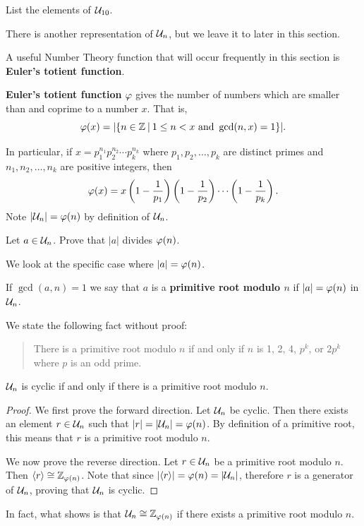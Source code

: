 \begin{exercise}
    List the elements of $\mathcal{U}_{10}$.
\end{exercise}

There is another representation of $\mathcal{U}_{n}$, but we leave it to later in this section.

A useful Number Theory function that will occur frequently in this section is \textbf{Euler's totient function}.

\newpage

\begin{definition}
    \textbf{Euler's totient function} $\varphi$ gives the number of numbers which are smaller than and coprime to a number $x$. That is,
    \[
        \totient(x) = |\{n \in \mathbb{Z} \vert 1 \leq n < x \text{ and } \gcd(n, x) = 1\}|.
    \]
\end{definition}
In particular, if $x = p_1^{n_1}p_2^{n_2}\cdots p_k^{n_k}$ where $p_1, p_2,\dots,p_k$ are distinct primes and $n_1,n_2,\dots,n_k$ are positive integers, then
\[
    \varphi(x) = x \left(1 - \frac1{p_1}\right)\left(1 - \frac1{p_2}\right)\cdots\left(1 - \frac1{p_k}\right).
\]
Note $|\mathcal{U}_{n}| = \varphi(n)$ by definition of $\mathcal{U}_{n}$.

\begin{exercise}\label{exercise-order-of-a-divides-phi-a}
    Let $a \in \mathcal{U}_{n}$. Prove that $|a|$ divides $\varphi(n)$.
\end{exercise}

We look at the specific case where $|a| = \varphi(n)$.
\begin{definition}
    If $\gcd(a, n) = 1$ we say that $a$ is a \textbf{primitive root modulo $n$} if $|a| = \varphi(n)$ in $\mathcal{U}_{n}$.
\end{definition}
We state the following fact without proof:
\begin{quote}
    There is a primitive root modulo $n$ if and only if $n$ is 1, 2, 4, $p^k$, or $2p^k$ where $p$ is an odd prime.
\end{quote}

\begin{proposition}\label{prop-Un-cyclic-only-if-exists-primitive-root}
    $\mathcal{U}_{n}$ is cyclic if and only if there is a primitive root modulo $n$.
\end{proposition}
\begin{proof}
    We first prove the forward direction. Let $\mathcal{U}_{n}$ be cyclic. Then there exists an element $r \in \mathcal{U}_{n}$ such that $|r| = |\mathcal{U}_{n}| = \varphi(n)$. By definition of a primitive root, this means that $r$ is a primitive root modulo $n$.

    We now prove the reverse direction. Let $r \in \mathcal{U}_{n}$ be a primitive root modulo $n$. Then $\langle r \rangle \cong \mathbb{Z}_{\varphi(n)}$. Note that since $|\langle r \rangle| = \varphi(n) = |\mathcal{U}_{n}|$, therefore $r$ is a generator of $\mathcal{U}_{n}$, proving that $\mathcal{U}_{n}$ is cyclic.
\end{proof}
\begin{remark}
    In fact, what  shows is that $\mathcal{U}_{n} \cong \mathbb{Z}_{\varphi(n)}$ if there exists a primitive root modulo $n$.
\end{remark}

